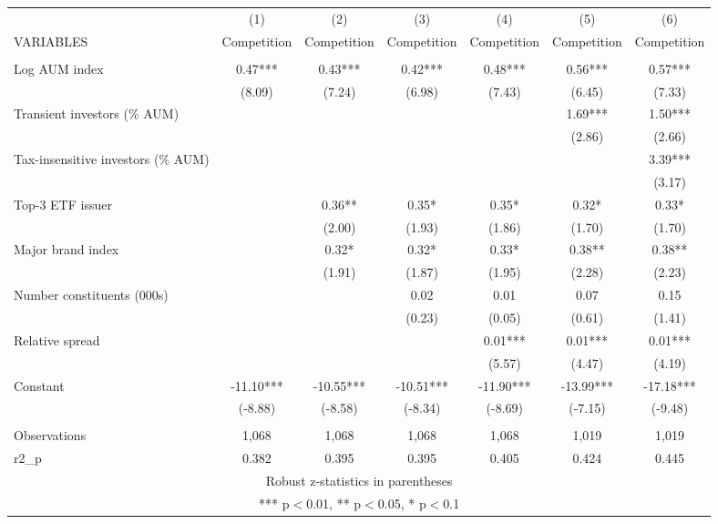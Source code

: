 \documentclass[]{article}
\begin{document}
\begin{tabular}{lcccccc} \hline
 & (1) & (2) & (3) & (4) & (5) & (6) \\
VARIABLES & Competition & Competition & Competition & Competition & Competition & Competition \\ \hline
 &  &  &  &  &  &  \\
Log AUM index & 0.47*** & 0.43*** & 0.42*** & 0.48*** & 0.56*** & 0.57*** \\
 & (8.09) & (7.24) & (6.98) & (7.43) & (6.45) & (7.33) \\
Transient investors (\% AUM) &  &  &  &  & 1.69*** & 1.50*** \\
 &  &  &  &  & (2.86) & (2.66) \\
Tax-insensitive investors (\% AUM) &  &  &  &  &  & 3.39*** \\
 &  &  &  &  &  & (3.17) \\
Top-3 ETF issuer &  & 0.36** & 0.35* & 0.35* & 0.32* & 0.33* \\
 &  & (2.00) & (1.93) & (1.86) & (1.70) & (1.70) \\
Major brand index &  & 0.32* & 0.32* & 0.33* & 0.38** & 0.38** \\
 &  & (1.91) & (1.87) & (1.95) & (2.28) & (2.23) \\
Number constituents (000s) &  &  & 0.02 & 0.01 & 0.07 & 0.15 \\
 &  &  & (0.23) & (0.05) & (0.61) & (1.41) \\
Relative spread &  &  &  & 0.01*** & 0.01*** & 0.01*** \\
 &  &  &  & (5.57) & (4.47) & (4.19) \\
Constant & -11.10*** & -10.55*** & -10.51*** & -11.90*** & -13.99*** & -17.18*** \\
 & (-8.88) & (-8.58) & (-8.34) & (-8.69) & (-7.15) & (-9.48) \\
 &  &  &  &  &  &  \\
Observations & 1,068 & 1,068 & 1,068 & 1,068 & 1,019 & 1,019 \\
 r2\_p & 0.382 & 0.395 & 0.395 & 0.405 & 0.424 & 0.445 \\ \hline
\multicolumn{7}{c}{ Robust z-statistics in parentheses} \\
\multicolumn{7}{c}{ *** p$<$0.01, ** p$<$0.05, * p$<$0.1} \\
\end{tabular}
\end{document}
